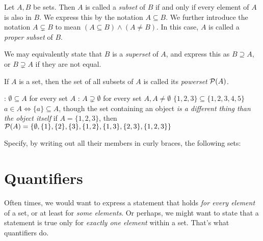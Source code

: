 Let \(A, B\) be sets. Then \(A\) is called a \emph{subset} of \(B\) if and only if
every element of \(A\) is also in \(B\). We express this by the notation
\(A \subseteq B\). We further introduce the notation \(A \subsetneq B\) to mean
\((A \subseteq B) \land (A \neq B)\). In this case, \(A\) is called a \emph{proper
  subset} of \(B\).

We may equivalently state that \(B\) is a \emph{superset} of \(A\), and express
this as \(B \supseteq A\), or \(B \supsetneq A\) if they are not equal.

If \(A\) is a set, then the set of all subsets of \(A\) is called its
\emph{powerset} \(\mathcal{P}(A)\).

\begin{example}
  \begin{itemize}
    \leavevmode
    :
          \(\emptyset \subseteq A\) for every set \(A\)
    :
          \(A \supsetneq \emptyset\) for every set \(A, A \neq \emptyset\)
    \ii{} \(\{1,2,3\} \subseteq \{1,2,3,4,5\}\)
    \ii{} \(a \in A \Leftrightarrow \{a\} \subseteq A\), though the set containing an object \emph{is a
          different thing than the object itself}
    \ii{} if \(A = \{1,2,3\}\), then
          \(\mathcal{P}(A) = \{\emptyset, \{1\}, \{2\}, \{3\}, \{1,2\}, \{1,3\}, \{2,3\}, \{1,2,3\}\}\)
  \end{itemize}
\end{example}

\begin{exercise}
  Specify, by writing out all their members in curly braces, the following sets:
  \begin{itemize}
    \ii{\(\PP(\emptyset)\)}
  \end{itemize}
\end{exercise}

\section{Quantifiers}

Often times, we would want to express a statement that holds \emph{for every
  element} of a set, or at least for \emph{some elements}.
Or perhaps, we might want to state that a statement is true only for
 \emph{exactly one element} within a set. That's what quantifiers do.

